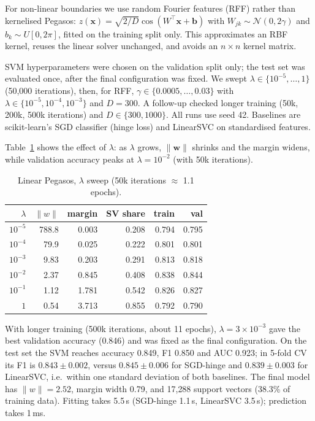 \documentclass[10pt,twocolumn,a4paper]{article}
\begin{document}
For non-linear boundaries we use random Fourier features (RFF) rather than
kernelised Pegasos: $z(\mathbf{x})=\sqrt{2/D}\cos(W^{\top}\mathbf{x}+\mathbf{b})$
with $W_{jk}\sim\mathcal{N}(0,2\gamma)$ and $b_k\sim U[0,2\pi]$, fitted on
the training split only. This approximates an RBF kernel, reuses the linear
solver unchanged, and avoids an $n\times n$ kernel matrix.

SVM hyperparameters were chosen on the validation split only; the test set
was evaluated once, after the final configuration was fixed. We swept
$\lambda\in\{10^{-5},\dots,1\}$ (50{,}000 iterations), then, for RFF,
$\gamma\in\{0.0005,\dots,0.03\}$ with $\lambda\in\{10^{-5},10^{-4},10^{-3}\}$
and $D=300$. A follow-up checked longer training (50k, 200k, 500k iterations)
and $D\in\{300,1000\}$. All runs use seed 42. Baselines are scikit-learn's
SGD classifier (hinge loss) and LinearSVC on standardised features.

Table~\ref{tab:svm_lambda} shows the effect of $\lambda$: as $\lambda$ grows,
$\lVert\mathbf{w}\rVert$ shrinks and the margin widens, while validation
accuracy peaks at $\lambda=10^{-2}$ (with 50k iterations).

\begin{table}[t]
  \centering
  \caption{Linear Pegasos, $\lambda$ sweep (50k iterations $\approx$ 1.1 epochs).}
  \label{tab:svm_lambda}
  \begin{tabular}{@{}rrrrrr@{}}
    \toprule
    $\lambda$ & $\lVert w\rVert$ & margin & SV share & train & val \\
    \midrule
    $10^{-5}$ & 788.8 & 0.003 & 0.208 & 0.794 & 0.795 \\
    $10^{-4}$ & 79.9  & 0.025 & 0.222 & 0.801 & 0.801 \\
    $10^{-3}$ & 9.83  & 0.203 & 0.291 & 0.813 & 0.818 \\
    $10^{-2}$ & 2.37  & 0.845 & 0.408 & 0.838 & 0.844 \\
    $10^{-1}$ & 1.12  & 1.781 & 0.542 & 0.826 & 0.827 \\
    $1$       & 0.54  & 3.713 & 0.855 & 0.792 & 0.790 \\
    \bottomrule
  \end{tabular}
\end{table}



With longer training (500k iterations, about 11 epochs), $\lambda=3\times10^{-3}$
gave the best validation accuracy (0.846) and was fixed as the final
configuration. On the test set the SVM reaches accuracy 0.849, F1 0.850 and
AUC 0.923; in 5-fold CV its F1 is $0.843\pm0.002$, versus $0.845\pm0.006$ for
SGD-hinge and $0.839\pm0.003$ for LinearSVC, i.e.\ within one standard
deviation of both baselines. The final model has $\lVert w\rVert=2.52$, margin
width 0.79, and 17{,}288 support vectors (38.3\% of training data). Fitting
takes 5.5\,s (SGD-hinge 1.1\,s, LinearSVC 3.5\,s); prediction takes 1\,ms.
\end{document}
